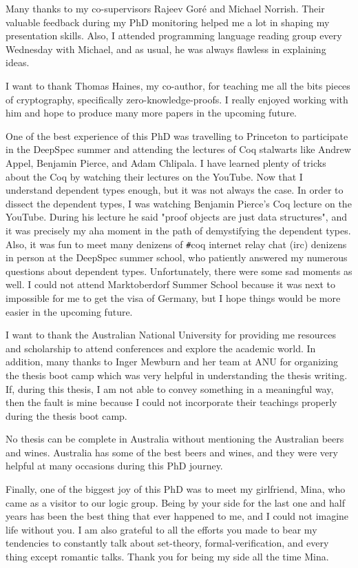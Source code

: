 Many thanks to my co-supervisors Rajeev Gor\'e and Michael Norrish. Their valuable feedback during my PhD monitoring 
helped me a lot in shaping my presentation skills. Also, I attended programming language reading 
group every Wednesday with  Michael, and as usual, he was always flawless in explaining ideas. 
 
 I want to thank Thomas Haines, my co-author,  for teaching me all the bits pieces of cryptography, specifically zero-knowledge-proofs.  
 I really enjoyed working with him and hope to produce many more papers in the upcoming future. 
 
 
 One of the best experience of this PhD was travelling to Princeton to participate in the DeepSpec summer and attending 
 the lectures of Coq stalwarts  like Andrew Appel, Benjamin Pierce, and Adam Chlipala. I have learned 
 plenty of tricks about the Coq by watching their lectures on the YouTube. Now that I understand 
 dependent types enough, but it was not always the case. In order to dissect the dependent types, 
 I was watching Benjamin Pierce's Coq lecture on the YouTube. During his lecture he said  "proof objects are 
 just data structures", and it was precisely my aha moment in the path of demystifying the dependent types. 
 Also, it was fun to meet many denizens of \texttt{\#}coq internet relay chat (irc) denizens in person at the DeepSpec summer 
 school, who patiently answered my numerous questions about dependent types.
 Unfortunately, there were some sad moments as well. I could not attend Marktoberdorf Summer School because 
 it was next to impossible for me to get the visa of Germany, but I hope
 things would be more easier in the upcoming future. 
 
 I want to thank the Australian National University for providing me resources and scholarship to attend 
 conferences and explore the academic world. In addition, many thanks to 
 Inger Mewburn  and her team at ANU for organizing the thesis boot camp which was very helpful 
 in understanding the thesis writing. If, during this thesis, I am not able to convey something in 
 a meaningful way, then the fault is mine because I could not incorporate their teachings properly 
 during the thesis boot camp. 
  
 No thesis can be complete in Australia without mentioning the Australian beers and wines. 
 Australia has some of the best beers and wines, and they were very helpful at many occasions
 during this PhD journey. 
 
 Finally, one of the biggest joy of this PhD was to meet my girlfriend, Mina, who came as a visitor 
 to our logic group. Being by your side for the last one and half years has been the best thing that ever happened to me, and I could not 
 imagine life without you.   I am also grateful to all the efforts you made to bear my tendencies to constantly
  talk about set-theory, formal-verification, and every thing except romantic talks. Thank you for being my side 
  all the time Mina. 
  
